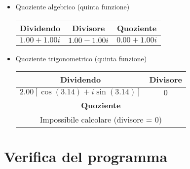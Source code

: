 \documentclass[a4paper,10pt]{article}
\begin{document}
\begin{itemize}
    \item Quoziente algebrico (quinta funzione)\\
        \begin{tabular}{|*3{c|}}
	\hline
	\bfseries Dividendo		& \bfseries Divisore		& \bfseries Quoziente\\
	\hline
	$1.00 + 1.00 i$			& $1.00 - 1.00 i$		& $0.00 + 1.00 i$\\
	\hline
	\end{tabular}

    \item Quoziente trigonometrico (quinta funzione)\\
    	\begin{tabular}{|*2{c|}}
	\hline
	\bfseries Dividendo						& \bfseries Divisore\\
	\hline
	$2.00[\cos{\left(3.14\right)} + i\sin{\left(3.14\right)}]$	& $0$\\
	\hline
	\multicolumn{2}{|c|}{\textbf{Quoziente}}\\
	\hline
	\multicolumn{2}{|c|}{Impossibile calcolare (divisore = 0)}\\
	\hline
	\end{tabular}    	
\end{itemize}

\newpage

\section*{ \textbf{Verifica del programma} }
\end{document}

